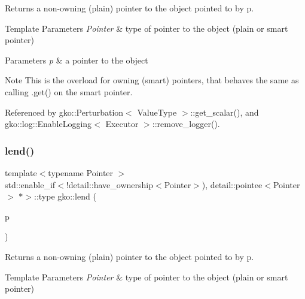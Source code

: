 Returns a non-\/owning (plain) pointer to the object pointed to by {\ttfamily p}. 


\begin{DoxyTemplParams}{Template Parameters}
{\em Pointer} & type of pointer to the object (plain or smart pointer)\\
\hline
\end{DoxyTemplParams}

\begin{DoxyParams}{Parameters}
{\em p} & a pointer to the object\\
\hline
\end{DoxyParams}
\begin{DoxyNote}{Note}
This is the overload for owning (smart) pointers, that behaves the same as calling .get() on the smart pointer. 
\end{DoxyNote}


Referenced by gko\+::\+Perturbation$<$ Value\+Type $>$\+::get\+\_\+scalar(), and gko\+::log\+::\+Enable\+Logging$<$ Executor $>$\+::remove\+\_\+logger().

\mbox{\label{namespacegko_aa0c1deeb105cfb5a635b5f41cb5e8321}} 
\subsubsection{\texorpdfstring{lend()}{lend()}\hspace{0.1cm}{\footnotesize\ttfamily [2/2]}}
{\footnotesize\ttfamily template$<$typename Pointer $>$ \\
std\+::enable\+\_\+if$<$!detail\+::have\+\_\+ownership$<$Pointer$>$), detail\+::pointee$<$Pointer$>$ $\ast$$>$\+::type gko\+::lend (\begin{DoxyParamCaption}\item[{const Pointer \&}]{p }\end{DoxyParamCaption})\hspace{0.3cm}{\ttfamily [inline]}}



Returns a non-\/owning (plain) pointer to the object pointed to by {\ttfamily p}. 


\begin{DoxyTemplParams}{Template Parameters}
{\em Pointer} & type of pointer to the object (plain or smart pointer)\\
\hline
\end{DoxyTemplParams}

